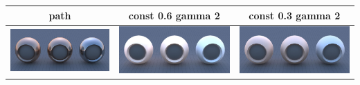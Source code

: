 \documentclass[11pt]{article}
\begin{document}
\begin{table}[ht]
  \centering
  \begin{tabular}{ | c | c | c |}
    \hline
    path & const 0.6 gamma 2 & const 0.3 gamma 2 \\ \hline
    \begin{minipage}{.3\textwidth}
      \includegraphics[scale=0.1]{img/obj/metals_el/metals_el.jpg}
    \end{minipage}
    &
    \begin{minipage}{.3\textwidth}
      \includegraphics[scale=0.1]{img/obj/metals_el/metals_el_disney.jpg}
    \end{minipage}
    & 
    \begin{minipage}{.3\textwidth}
      \includegraphics[scale=0.1]{img/obj/metals_el/metals_el_disney_dc03.jpg}
    \end{minipage}
    \\ \hline
  \end{tabular}
\end{table}
\end{document}
